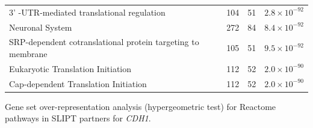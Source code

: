\begin{table}[!ht]
{\begin{threeparttable}
\begin{tabular}{lccc}
  3' -UTR-mediated translational regulation & 104 &  51 & $2.8 \times 10^{-92}$ \\ 
  \rowcolor{black!10}
  Neuronal System & 272 &  84 & $8.4 \times 10^{-92}$ \\ 
  \rowcolor{black!5}
  SRP-dependent cotranslational protein targeting to membrane & 105 &  51 & $9.5 \times 10^{-92}$ \\ 
  \rowcolor{black!10}
  Eukaryotic Translation Initiation & 112 &  52 & $2.0 \times 10^{-90}$ \\ 
  \rowcolor{black!5}
  Cap-dependent Translation Initiation & 112 &  52 & $2.0 \times 10^{-90}$ \\ 
   \hline
\end{tabular}
\begin{tablenotes}
\raggedright \small
Gene set over-representation analysis (hypergeometric test) for Reactome pathways in \gls{SLIPT} partners for \textit{CDH1}.
\end{tablenotes}
\end{threeparttable}
}
\end{table}

\FloatBarrier






